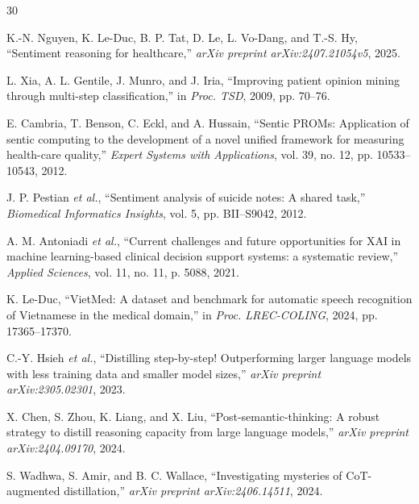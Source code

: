 \documentclass[conference]{IEEEtran}
\begin{document}

% 

\begin{thebibliography}{30}

K.-N. Nguyen, K. Le-Duc, B. P. Tat, D. Le, L. Vo-Dang, and T.-S. Hy,
``Sentiment reasoning for healthcare,''
\textit{arXiv preprint arXiv:2407.21054v5}, 2025.

L. Xia, A. L. Gentile, J. Munro, and J. Iria,
``Improving patient opinion mining through multi-step classification,''
in \textit{Proc. TSD}, 2009, pp. 70--76.

E. Cambria, T. Benson, C. Eckl, and A. Hussain,
``Sentic PROMs: Application of sentic computing to the development of a novel unified framework for measuring health-care quality,''
\textit{Expert Systems with Applications}, vol. 39, no. 12, pp. 10533--10543, 2012.

J. P. Pestian \textit{et al.},
``Sentiment analysis of suicide notes: A shared task,''
\textit{Biomedical Informatics Insights}, vol. 5, pp. BII--S9042, 2012.

A. M. Antoniadi \textit{et al.},
``Current challenges and future opportunities for XAI in machine learning-based clinical decision support systems: a systematic review,''
\textit{Applied Sciences}, vol. 11, no. 11, p. 5088, 2021.

K. Le-Duc,
``VietMed: A dataset and benchmark for automatic speech recognition of Vietnamese in the medical domain,''
in \textit{Proc. LREC-COLING}, 2024, pp. 17365--17370.

C.-Y. Hsieh \textit{et al.},
``Distilling step-by-step! Outperforming larger language models with less training data and smaller model sizes,''
\textit{arXiv preprint arXiv:2305.02301}, 2023.

X. Chen, S. Zhou, K. Liang, and X. Liu,
``Post-semantic-thinking: A robust strategy to distill reasoning capacity from large language models,''
\textit{arXiv preprint arXiv:2404.09170}, 2024.

S. Wadhwa, S. Amir, and B. C. Wallace,
``Investigating mysteries of CoT-augmented distillation,''
\textit{arXiv preprint arXiv:2406.14511}, 2024.


\end{thebibliography}
\end{document}
